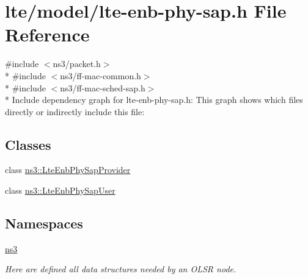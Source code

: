 \hypertarget{lte-enb-phy-sap_8h}{}\section{lte/model/lte-\/enb-\/phy-\/sap.h File Reference}
\label{lte-enb-phy-sap_8h}
{\ttfamily \#include $<$ns3/packet.\+h$>$}\\*
{\ttfamily \#include $<$ns3/ff-\/mac-\/common.\+h$>$}\\*
{\ttfamily \#include $<$ns3/ff-\/mac-\/sched-\/sap.\+h$>$}\\*
Include dependency graph for lte-\/enb-\/phy-\/sap.h\+:
This graph shows which files directly or indirectly include this file\+:
\subsection*{Classes}
\begin{DoxyCompactItemize}
\item 
class \hyperlink{classns3_1_1LteEnbPhySapProvider}{ns3\+::\+Lte\+Enb\+Phy\+Sap\+Provider}
\item 
class \hyperlink{classns3_1_1LteEnbPhySapUser}{ns3\+::\+Lte\+Enb\+Phy\+Sap\+User}
\end{DoxyCompactItemize}
\subsection*{Namespaces}
\begin{DoxyCompactItemize}
\item 
 \hyperlink{namespacens3}{ns3}
\begin{DoxyCompactList}\small\item\em Here are defined all data structures needed by an O\+L\+SR node. \end{DoxyCompactList}\end{DoxyCompactItemize}
